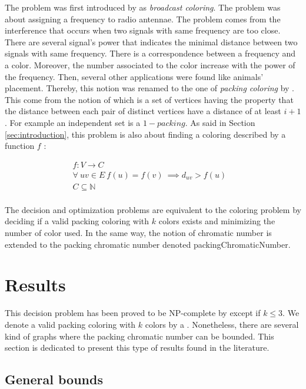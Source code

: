 The problem was first introduced by \cite{broadcastchromatic} as \textit{broadcast coloring}. The problem was about assigning a frequency to radio antennae. The problem comes from the interference that occurs when two signals with same frequency are too close. There are several signal's power that indicates the minimal distance between two signals with same frequency. There is a correspondence between a frequency and a color. Moreover, the number associated to the color increase with the power of the frequency. Then, several other applications were found  like animals' placement. Thereby, this notion was renamed to the one of \textit{packing coloring} by \cite{PCNLatice}. This come from the notion of  which is a set of vertices having the property that the distance between each pair of distinct vertices have a distance of at least $i + 1$. For example an independent set is a $1-packing$. As said in Section \ref{sec:introduction}, this problem is also about finding a coloring described by a function $f$ :

\begin{equation}
\begin{aligned}
f : V \longrightarrow C & \\
\forall\ uv \in E\ f(u) = f(v)\  \implies  d_{uv} > f(u) &\\
C \subseteq \mathbb{N} & \\
\end{aligned}
\end{equation}

The decision and optimization problems are equivalent to the coloring problem by deciding if a valid packing coloring with $k$ colors exists and minimizing the number of color used. In the same way, the notion of chromatic number is extended to the packing chromatic number denoted \gls{packingChromaticNumber}. \\

\section{Results}
\label{sec:PCresults}
This decision problem has been proved to be NP-complete by \cite{broadcastchromatic} except if $k \leq 3$. We denote a valid packing coloring with $k$ colors by a . Nonetheless, there are several kind of graphs where the packing chromatic number can be bounded. This section is dedicated to present this type of results found in the literature.


\subsection{General bounds}

